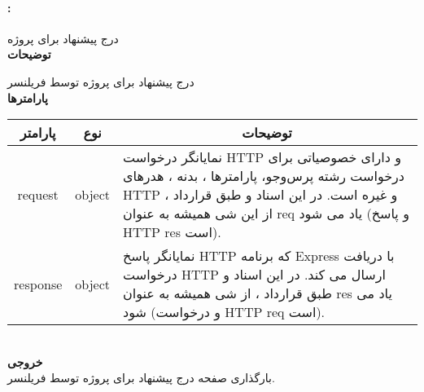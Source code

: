 \paragraph{:}
درج پیشنهاد برای پروژه‌
\\
\textbf{توضیحات}
\hr
\begin{flushleft}
	\framebox[.9\textwidth][l]{
		\lr{
			\textcolor{type}{void}
			\textcolor{func}{getAddRequest}
			\textcolor{symb}{(}
			\textcolor{type}{object}
			\textcolor{arg}{request}
			\textcolor{symb}{,}
			\textcolor{type}{object}
			\textcolor{arg}{response}
			\textcolor{symb}{);}
		}
	}
\end{flushleft}
درج پیشنهاد برای پروژه‌ توسط فریلنسر
\\
\textbf{پارامترها}
\hr \\[10pt]
\begin{tabular}{|m{4cm}|m{3cm}|m{10cm}|}
	\hline
	\multicolumn{1}{|c}{پارامتر}
	&
	\multicolumn{1}{|c}{نوع}
	&
	\multicolumn{1}{|c|}{توضیحات}
	\\
	\hline
	\multicolumn{1}{|c}{request}
	&
	\multicolumn{1}{|c|}{object}
	&
	نمایانگر درخواست HTTP و دارای خصوصیاتی برای درخواست رشته پرس‌و‌جو، پارامترها ، بدنه ، هدرهای HTTP و غیره است.
	در این اسناد و طبق قرارداد ، از این شی همیشه به عنوان req یاد می شود (و پاسخ HTTP res است).
	\\
	\hline
	\multicolumn{1}{|c}{response}
	&
	\multicolumn{1}{|c|}{object}
	&
	نمایانگر پاسخ HTTP که برنامه Express با دریافت درخواست HTTP ارسال می کند.
	در این اسناد و طبق قرارداد ، از شی همیشه به عنوان res یاد می شود (و درخواست HTTP req است).
	\\
	\hline
\end{tabular}
\\[10pt]
\textbf{خروجی}
\hr \\
بارگذاری صفحه درج پیشنهاد برای پروژه‌ توسط فریلنسر.

